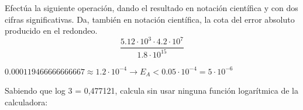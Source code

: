 \documentclass[addpoints,spanish, 12pt,a4paper]{exam}
\begin{document}
\begin{questions}

\question[1] Efectúa la siguiente operación, dando el resultado en notación científica y con dos cifras significativas. Da, también en notación científica, la cota del error absoluto producido en el redondeo.
$$\frac{5.12\cdot {10}^3 \cdot 4.2\cdot {10}^7}{1.8 \cdot {10}^{15}}$$
\begin{solution}
$0.000119466666666667\approx 1.2\cdot10^{-4} \to E_A < 0.05 \cdot10^{-4} = 5 \cdot10^{-6}$
\end{solution}



        
\question[1] Sabiendo que log 3 = 0,477121, calcula sin usar ninguna función logarítmica de la calculadora:
         
\end{questions}
\end{document}
